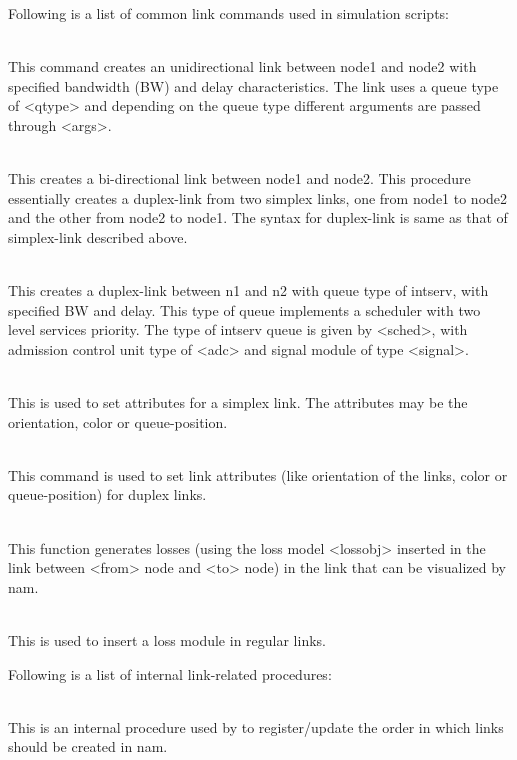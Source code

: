 Following is a list of common link commands used in simulation scripts:
\begin{flushleft}

\\
This command creates an unidirectional link between node1 and node2 with
specified bandwidth (BW) and delay characteristics. The link uses a queue
type of <qtype> and depending on the queue type different arguments are
passed through <args>.


\\
This creates a bi-directional link between node1 and node2. This procedure
essentially creates a duplex-link from two simplex links, one from node1
to node2 and the other from node2 to node1. The syntax for duplex-link is
same as that of simplex-link described above.


\\
This creates a duplex-link between n1 and n2 with queue type of intserv, with
specified BW and delay. This type of queue implements a scheduler with two
level services priority. The type of intserv queue is given by <sched>, with
admission control unit type of <adc> and signal module of type <signal>.


\\
This is used to set attributes for a simplex link. The attributes may be
the orientation, color or queue-position.


\\
This command is used to set link attributes (like orientation of the links,
color or queue-position) for duplex links.


\\
This function generates losses (using the loss model <lossobj> inserted in
the link between <from> node and <to> node) in the link that can be
visualized by nam.


\\
This is used to insert a loss module in regular links.


Following is a list of internal link-related procedures:

\\
This is an internal procedure used by  to 
register/update the order in which links should be created in nam.



\end{flushleft}
